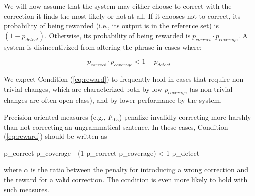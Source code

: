\documentclass[a4paper]{article}
\newenvironment{myequation}{
  \vspace{-1em}
 \begin{equation}
}{
 \end{equation}
 \vspace{-1.2em}
}
\newenvironment{myequation*}{
	\vspace{-1em}
	\begin{equation*}
}{
\end{equation*}
\vspace{-1.2em}
}
\begin{document}
We will now assume that the system may either choose to correct with the correction it finds 
the most likely or not at all. If it chooses not to correct, its probability of being rewarded 
(i.e., its output is in the reference set) is $(1-p_{detect})$. Otherwise, its probability
of being rewarded is $p_{correct} \cdot p_{coverage}$.
A system is disincentivized from altering the phrase in cases where:

\begin{small}
	\begin{myequation}
		\label{eq:reward}
		p_{correct} \cdot p_{coverage} < 1-p_{detect} 
	\end{myequation}
\end{small}


We expect Condition (\ref{eq:reward}) to frequently hold in cases that
require non-trivial changes, which are characterized both by low $p_{coverage}$ (as non-trivial
changes are often open-class), and by lower performance by the system.

Precision-oriented measures (e.g., $F_{0.5}$) penalize invalidly correcting more
harshly than not correcting an ungrammatical sentence.
In these cases, Condition (\ref{eq:reward}) should be written as

\begin{small}
	\begin{myequation*}
		p_{correct} \cdot p_{coverage} - \left(1-p_{correct} \cdot p_{coverage}\right) \alpha < 1-p_{detect} 
	\end{myequation*}
\end{small}

\noindent
where $\alpha$ is the ratio between the penalty for introducing a wrong correction and the reward for a valid correction. The condition is even more likely to hold with such measures.


\end{document}
